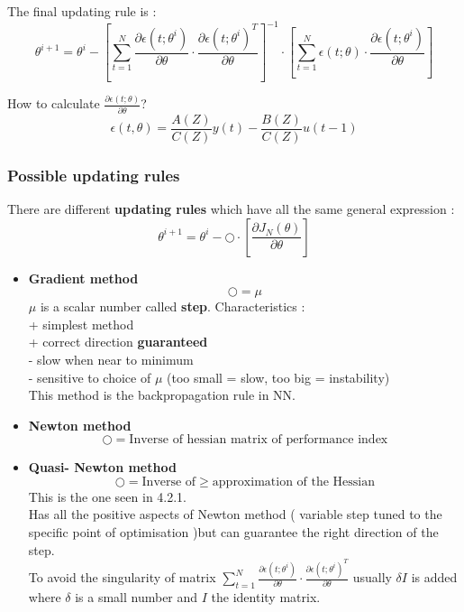 The final updating rule is :
\[
\boxed{\theta^{i+1} = \theta^i - \left[ \sum\limits_{t=1}^{N} \frac{\partial \epsilon(t;\theta^i)}{\partial{\theta}} \cdot \frac{\partial \epsilon(t;\theta^i)^T}{\partial{\theta}} \right]^{-1} \cdot  \left[ \sum\limits_{t=1}^{N} \epsilon(t;\theta) \cdot \frac{\partial \epsilon(t;\theta^i)}{\partial{\theta}} \right]}
\]

How to calculate $\frac{\partial \epsilon(t;\theta)}{\partial{\theta}}$?\\
$$\epsilon(t,\theta)= \frac{A(Z)}{C(Z)}y(t) - \frac{B(Z)}{C(Z)}u(t-1)$$


\subsubsection{Possible updating rules}
There are different \textbf{updating rules} which have all the same general expression : 
\[
\boxed{\theta^{i+1} = \theta^i - \bigcirc  \cdot \left[ \frac{\partial{J_N(\theta)}}{\partial{\theta}}\right]}
\] 

\begin{itemize}
\item \textbf{Gradient method}\\
$$ \bigcirc = \mu $$  $\mu$ is a scalar number called \textbf{step}.
Characteristics :\\
+ simplest method\\
+ correct direction \textbf{guaranteed}\\
- slow when near to minimum\\
- sensitive to choice of $\mu$ (too small = slow, too big = instability)\\
This method is the backpropagation rule in NN.
\item \textbf{Newton method}\\
$$ \bigcirc = \text{Inverse of hessian matrix of performance index} $$ 
\item \textbf{Quasi- Newton method}\\
$$ \bigcirc = \text{Inverse of} \geq \text{approximation of the Hessian} $$ 
This is the one seen in 4.2.1.\\
Has all the positive aspects of Newton method ( variable step tuned to the specific point of optimisation )but can guarantee the right direction of the step.\\
To avoid the singularity of matrix $ \sum\limits_{t=1}^{N} \frac{\partial \epsilon(t;\theta^i)}{\partial{\theta}} \cdot \frac{\partial \epsilon(t;\theta^i)^T}{\partial{\theta}} $ usually $\delta I$ is added where $\delta$ is a small number and $I$ the identity matrix. 
\end{itemize}